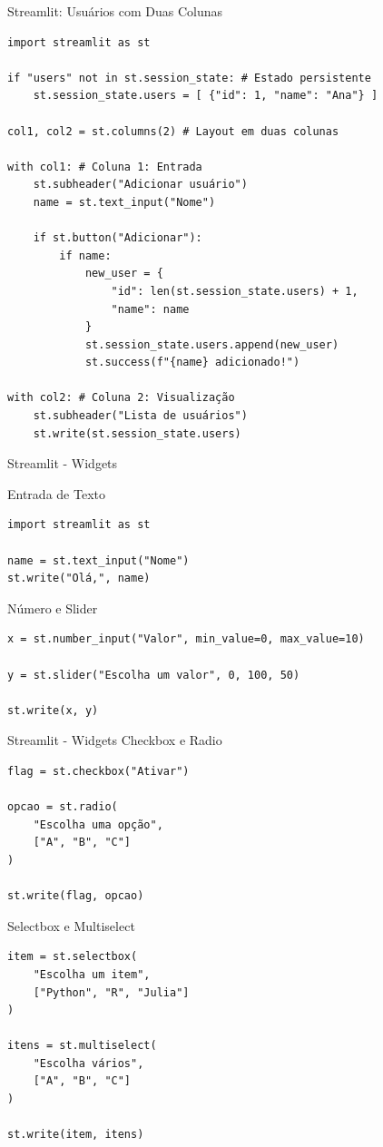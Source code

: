 \documentclass{beamer}
\begin{document}
\begin{frame}[fragile]{Streamlit: Usuários com Duas Colunas}

\begin{verbatim}
import streamlit as st

if "users" not in st.session_state: # Estado persistente
    st.session_state.users = [ {"id": 1, "name": "Ana"} ]

col1, col2 = st.columns(2) # Layout em duas colunas

with col1: # Coluna 1: Entrada
    st.subheader("Adicionar usuário")
    name = st.text_input("Nome")

    if st.button("Adicionar"):
        if name:
            new_user = {
                "id": len(st.session_state.users) + 1,
                "name": name
            }
            st.session_state.users.append(new_user)
            st.success(f"{name} adicionado!")

with col2: # Coluna 2: Visualização
    st.subheader("Lista de usuários")
    st.write(st.session_state.users)
\end{verbatim}

\end{frame}

\begin{frame}[fragile]{Streamlit - Widgets}

Entrada de Texto
\begin{verbatim}
import streamlit as st

name = st.text_input("Nome")
st.write("Olá,", name)
\end{verbatim}

Número e Slider
\begin{verbatim}
x = st.number_input("Valor", min_value=0, max_value=10)

y = st.slider("Escolha um valor", 0, 100, 50)

st.write(x, y)
\end{verbatim}

\end{frame}

\begin{frame}[fragile]{Streamlit - Widgets}
Checkbox e Radio
\begin{verbatim}
flag = st.checkbox("Ativar")

opcao = st.radio(
    "Escolha uma opção",
    ["A", "B", "C"]
)

st.write(flag, opcao)
\end{verbatim}

Selectbox e Multiselect
\begin{verbatim}
item = st.selectbox(
    "Escolha um item",
    ["Python", "R", "Julia"]
)

itens = st.multiselect(
    "Escolha vários",
    ["A", "B", "C"]
)

st.write(item, itens)
\end{verbatim}

\end{frame}
\end{document}
